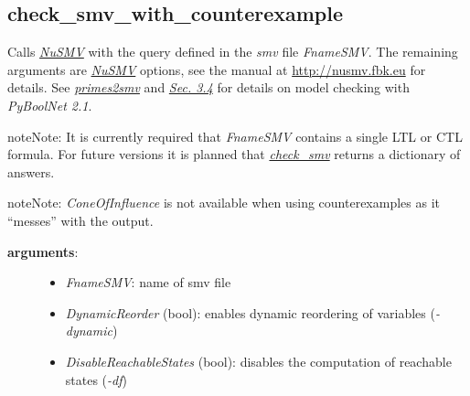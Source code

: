 \documentclass[letterpaper,10pt,english]{sphinxmanual}
\begin{document}
\subsection{check\_smv\_with\_counterexample}
\label{ModelChecking:id5}\label{ModelChecking:check-smv-with-counterexample}

\begin{fulllineitems}
\label{ModelChecking:PyBoolNet.ModelChecking.check_smv_with_counterexample}
Calls {\hyperref[Installation:installation-nusmv]{\emph{NuSMV}}} with the query defined in the \emph{smv} file \emph{FnameSMV}.
The remaining arguments are {\hyperref[Installation:installation-nusmv]{\emph{NuSMV}}} options, see the manual at \href{http://nusmv.fbk.eu}{http://nusmv.fbk.eu} for details.
See {\hyperref[ModelChecking:primes2smv]{\emph{primes2smv}}} and {\hyperref[Manual:sec-model-checking]{\emph{Sec. 3.4}}} for details on model checking with \emph{PyBoolNet 2.1}.

\begin{notice}{note}{Note:}
It is currently required that \emph{FnameSMV} contains a single LTL or CTL formula.
For future versions it is planned that {\hyperref[ModelChecking:check-smv]{\emph{check\_smv}}} returns a dictionary of answers.
\end{notice}

\begin{notice}{note}{Note:}
\emph{ConeOfInfluence} is not available when using counterexamples as it ``messes'' with the output.
\end{notice}
\begin{description}
\item[{\textbf{arguments}:}] \leavevmode\begin{itemize}
\item {} 
\emph{FnameSMV}: name of smv file

\item {} 
\emph{DynamicReorder} (bool): enables dynamic reordering of variables (\emph{-dynamic})

\item {} 
\emph{DisableReachableStates} (bool): disables the computation of reachable states (\emph{-df})

\end{itemize}


\end{description}
\end{fulllineitems}
\end{document}
